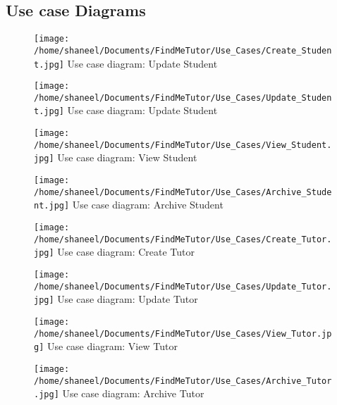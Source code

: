 \documentclass[11pt,a4paper]{article}
\begin{document}
		\subsection{Use case Diagrams}
		
		\begin{figure}[ht!]
		\centering
		\texttt{[image: /home/shaneel/Documents/FindMeTutor/Use\_Cases/Create\_Student.jpg]}
		Use case diagram: Update Student 		
		
		\end{figure}
		
		\begin{figure}[ht!]
		\centering
		\texttt{[image: /home/shaneel/Documents/FindMeTutor/Use\_Cases/Update\_Student.jpg]}
		Use case diagram: Update Student 
		\end{figure}
		
		\begin{figure}[ht!]
		\centering
		\texttt{[image: /home/shaneel/Documents/FindMeTutor/Use\_Cases/View\_Student.jpg]}
		Use case diagram: View Student 
		\end{figure}
		
		\begin{figure}[ht!]
		\centering
		\texttt{[image: /home/shaneel/Documents/FindMeTutor/Use\_Cases/Archive\_Student.jpg]}
		Use case diagram: Archive Student
		\end{figure}
		
		\begin{figure}[ht!]
		\centering
		\texttt{[image: /home/shaneel/Documents/FindMeTutor/Use\_Cases/Create\_Tutor.jpg]}
		Use case diagram: Create Tutor
		\end{figure}
		
		\begin{figure}[ht!]
		\centering
		\texttt{[image: /home/shaneel/Documents/FindMeTutor/Use\_Cases/Update\_Tutor.jpg]}
		Use case diagram: Update Tutor
		\end{figure}
		
		\begin{figure}[ht!]
		\centering
		\texttt{[image: /home/shaneel/Documents/FindMeTutor/Use\_Cases/View\_Tutor.jpg]}
		Use case diagram: View Tutor
		\end{figure}
		
		\begin{figure}[ht!]
		\centering
		\texttt{[image: /home/shaneel/Documents/FindMeTutor/Use\_Cases/Archive\_Tutor.jpg]}
		Use case diagram: Archive Tutor
		\end{figure}
	
\end{document}
